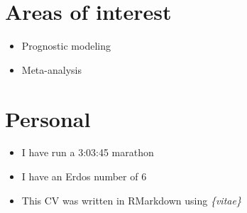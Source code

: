 \documentclass[11pt,a4paper,]{awesome-cv}
\providecommand{\tightlist}{%
	\setlength{\itemsep}{0pt}\setlength{\parskip}{0pt}}
\begin{document}
\section{Areas of interest}\label{areas-of-interest-1}

\begin{itemize}
\tightlist
\item
  Prognostic modeling
\item
  Meta-analysis
\end{itemize}

\section{Personal}\label{personal-1}

\begin{itemize}
\tightlist
\item
  I have run a 3:03:45 marathon
\item
  I have an Erdos number of 6
\item
  This CV was written in RMarkdown using \emph{\{vitae\}}
\end{itemize}


\label{LastPage}~
\end{document}
